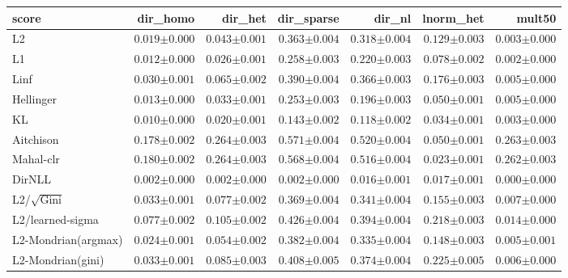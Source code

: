 \begin{tabular}{lrrrrrr}
\toprule
score & dir\_homo & dir\_het & dir\_sparse & dir\_nl & lnorm\_het & mult50 \\
\midrule
L2 & $0.019{\scriptstyle\pm0.000}$ & $0.043{\scriptstyle\pm0.001}$ & $0.363{\scriptstyle\pm0.004}$ & $0.318{\scriptstyle\pm0.004}$ & $0.129{\scriptstyle\pm0.003}$ & $0.003{\scriptstyle\pm0.000}$ \\
L1 & $0.012{\scriptstyle\pm0.000}$ & $0.026{\scriptstyle\pm0.001}$ & $0.258{\scriptstyle\pm0.003}$ & $0.220{\scriptstyle\pm0.003}$ & $0.078{\scriptstyle\pm0.002}$ & $0.002{\scriptstyle\pm0.000}$ \\
Linf & $0.030{\scriptstyle\pm0.001}$ & $0.065{\scriptstyle\pm0.002}$ & $0.390{\scriptstyle\pm0.004}$ & $0.366{\scriptstyle\pm0.003}$ & $0.176{\scriptstyle\pm0.003}$ & $0.005{\scriptstyle\pm0.000}$ \\
Hellinger & $0.013{\scriptstyle\pm0.000}$ & $0.033{\scriptstyle\pm0.001}$ & $0.253{\scriptstyle\pm0.003}$ & $0.196{\scriptstyle\pm0.003}$ & $0.050{\scriptstyle\pm0.001}$ & $0.005{\scriptstyle\pm0.000}$ \\
KL & $0.010{\scriptstyle\pm0.000}$ & $0.020{\scriptstyle\pm0.001}$ & $0.143{\scriptstyle\pm0.002}$ & $0.118{\scriptstyle\pm0.002}$ & $0.034{\scriptstyle\pm0.001}$ & $0.003{\scriptstyle\pm0.000}$ \\
Aitchison & $0.178{\scriptstyle\pm0.002}$ & $0.264{\scriptstyle\pm0.003}$ & $0.571{\scriptstyle\pm0.004}$ & $0.520{\scriptstyle\pm0.004}$ & $0.050{\scriptstyle\pm0.001}$ & $0.263{\scriptstyle\pm0.003}$ \\
Mahal-clr & $0.180{\scriptstyle\pm0.002}$ & $0.264{\scriptstyle\pm0.003}$ & $0.568{\scriptstyle\pm0.004}$ & $0.516{\scriptstyle\pm0.004}$ & $0.023{\scriptstyle\pm0.001}$ & $0.262{\scriptstyle\pm0.003}$ \\
DirNLL & $\mathbf{0.002}{\scriptstyle\pm0.000}$ & $\mathbf{0.002}{\scriptstyle\pm0.000}$ & $\mathbf{0.002}{\scriptstyle\pm0.000}$ & $\mathbf{0.016}{\scriptstyle\pm0.001}$ & $\mathbf{0.017}{\scriptstyle\pm0.001}$ & $\mathbf{0.000}{\scriptstyle\pm0.000}$ \\
L2/$\sqrt{\mathrm{Gini}}$ & $0.033{\scriptstyle\pm0.001}$ & $0.077{\scriptstyle\pm0.002}$ & $0.369{\scriptstyle\pm0.004}$ & $0.341{\scriptstyle\pm0.004}$ & $0.155{\scriptstyle\pm0.003}$ & $0.007{\scriptstyle\pm0.000}$ \\
L2/learned-sigma & $0.077{\scriptstyle\pm0.002}$ & $0.105{\scriptstyle\pm0.002}$ & $0.426{\scriptstyle\pm0.004}$ & $0.394{\scriptstyle\pm0.004}$ & $0.218{\scriptstyle\pm0.003}$ & $0.014{\scriptstyle\pm0.000}$ \\
L2-Mondrian(argmax) & $0.024{\scriptstyle\pm0.001}$ & $0.054{\scriptstyle\pm0.002}$ & $0.382{\scriptstyle\pm0.004}$ & $0.335{\scriptstyle\pm0.004}$ & $0.148{\scriptstyle\pm0.003}$ & $0.005{\scriptstyle\pm0.001}$ \\
L2-Mondrian(gini) & $0.033{\scriptstyle\pm0.001}$ & $0.085{\scriptstyle\pm0.003}$ & $0.408{\scriptstyle\pm0.005}$ & $0.374{\scriptstyle\pm0.004}$ & $0.225{\scriptstyle\pm0.005}$ & $0.006{\scriptstyle\pm0.000}$ \\
\bottomrule
\end{tabular}